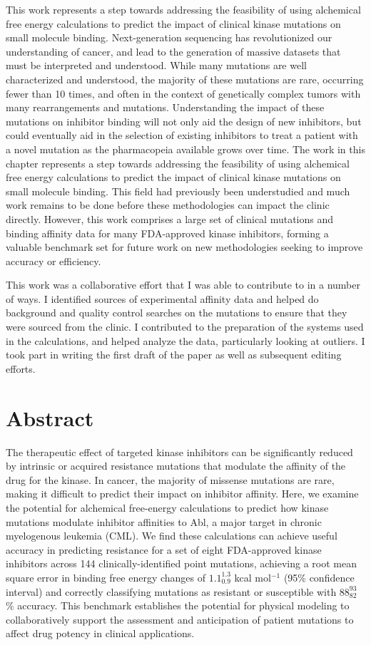 \documentclass[phd,tocprelim]{cornell}
\begin{document}
\medskip
This work represents a step towards addressing the feasibility of using alchemical free energy calculations to predict the impact of clinical kinase mutations on small molecule binding. Next-generation sequencing has revolutionized our understanding of cancer, and lead to the generation of massive datasets that must be interpreted and understood. While many mutations are well characterized and understood, the majority of these mutations are rare, occurring fewer than 10 times, and often in the context of genetically complex tumors with many rearrangements and mutations. Understanding the impact of these mutations on inhibitor binding will not only aid the design of new inhibitors, but could eventually aid in the selection of existing inhibitors to treat a patient with a novel mutation as the pharmacopeia available grows over time. The work in this chapter represents a step towards addressing the feasibility of using alchemical free energy calculations to predict the impact of clinical kinase mutations on small molecule binding. This field had previously been understudied and much work remains to be done before these methodologies can impact the clinic directly. However, this work comprises a large set of clinical mutations and binding affinity data for many FDA-approved kinase inhibitors, forming a valuable benchmark set for future work on new methodologies seeking to improve accuracy or efficiency. 

This work was a collaborative effort that I was able to contribute to in a number of ways. I identified sources of experimental affinity data and helped do background and quality control searches on the mutations to ensure that they were sourced from the clinic. I contributed to the preparation of the systems used in the calculations, and helped analyze the data, particularly looking at outliers. I took part in writing the first draft of the paper as well as subsequent editing efforts. 


\section{Abstract}
	The therapeutic effect of targeted kinase inhibitors can be significantly reduced by intrinsic or acquired resistance mutations that modulate the affinity of the drug for the kinase.
	In cancer, the majority of missense mutations are rare, making it difficult to predict their impact on inhibitor affinity. 
	Here, we examine the potential for alchemical free-energy calculations to predict how kinase mutations modulate inhibitor affinities to Abl, a major target in chronic myelogenous leukemia (CML).
	We find these calculations can achieve useful accuracy in predicting resistance for a set of eight FDA-approved kinase inhibitors across 144 clinically-identified point mutations, achieving a root mean square error in binding free energy changes of $1.1_{0.9}^{1.3}$ kcal mol$^{-1}$ (95\% confidence interval) and correctly classifying mutations as resistant or susceptible with $88_{82}^{93}$\% accuracy.
	This benchmark establishes the potential for physical modeling to collaboratively support the assessment and anticipation of patient mutations to affect drug potency in clinical applications.
	
\end{document}
